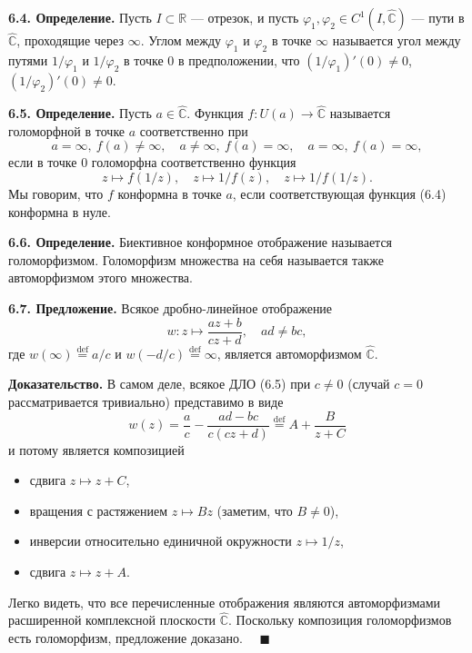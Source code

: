 \documentclass[12pt, a4paper]{article}
\theoremstyle{definition}
\theoremstyle{remark}
\begin{document}
\textbf{6.4. Определение.} Пусть $I \subset \mathbb{R}$ --- отрезок, и пусть $\varphi_1, \varphi_2 \in C^1(I, \hat{\mathbb{C}})$ --- пути в $\hat{\mathbb{C}}$, проходящие через $\infty$. Углом между $\varphi_1$ и $\varphi_2$ в точке $\infty$ называется угол между путями $1/\varphi_1$ и $1/\varphi_2$ в точке $0$ в предположении, что $(1/\varphi_1)'(0) \neq 0$, $(1/\varphi_2)'(0) \neq 0$.

\textbf{6.5. Определение.} Пусть $a \in \hat{\mathbb{C}}$. Функция $f : U(a) \to \hat{\mathbb{C}}$ называется голоморфной в точке $a$ соответственно при
\[
a = \infty, \ f(a) \neq \infty, \quad a \neq \infty, \ f(a) = \infty, \quad a = \infty, \ f(a) = \infty,
\]
если в точке $0$ голоморфна соответственно функция
\begin{equation}\tag{6.4}
	z \mapsto f(1/z), \quad z \mapsto 1/f(z), \quad z \mapsto 1/f(1/z).
\end{equation}
Мы говорим, что $f$ конформна в точке $a$, если соответствующая функция (6.4) конформна в нуле.

\textbf{6.6. Определение.} Биективное конформное отображение называется голоморфизмом. Голоморфизм множества на себя называется также автоморфизмом этого множества.

\textbf{6.7. Предложение.} Всякое дробно-линейное отображение
\begin{equation}\tag{6.5}
	w : z \mapsto \frac{az + b}{cz + d}, \quad ad \neq bc,
\end{equation}
где $w(\infty) \stackrel{\text{def}}{=} a/c$ и $w(-d/c) \stackrel{\text{def}}{=} \infty$, является автоморфизмом $\hat{\mathbb{C}}$.

\textbf{Доказательство.} В самом деле, всякое ДЛО (6.5) при $c \neq 0$ (случай $c = 0$ рассматривается тривиально) представимо в виде
\[
w(z) = \frac{a}{c} - \frac{ad - bc}{c(cz + d)} \stackrel{\text{def}}{=} A + \frac{B}{z + C}
\]
и потому является композицией
\begin{itemize}
	\item сдвига $z \mapsto z + C$,
	\item вращения с растяжением $z \mapsto Bz$ (заметим, что $B \neq 0$),
	\item инверсии относительно единичной окружности $z \mapsto 1/z$,
	\item сдвига $z \mapsto z + A$.
\end{itemize}
Легко видеть, что все перечисленные отображения являются автоморфизмами расширенной комплексной плоскости $\hat{\mathbb{C}}$. Поскольку композиция голоморфизмов есть голоморфизм, предложение доказано. $\quad \blacksquare$
\end{document}
